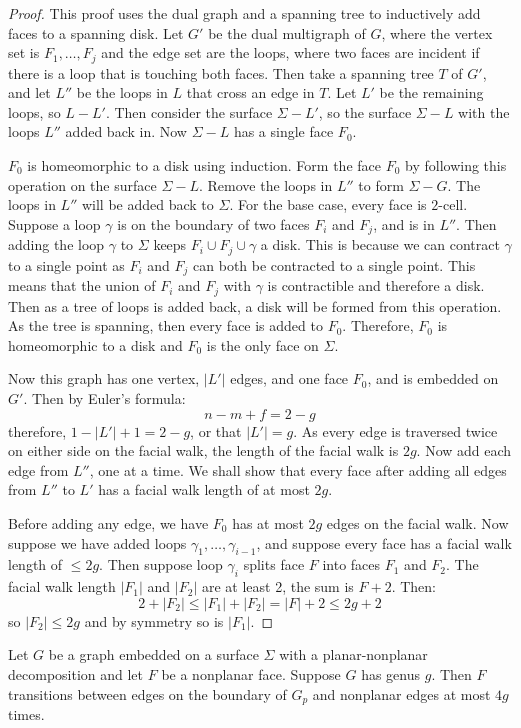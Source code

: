 \begin{proof}
	This proof uses the dual graph and a spanning tree to inductively add faces to a spanning disk. 
	Let \(G'\) be the dual multigraph of $G$, where the vertex set is \(F_1, \ldots, F_j\) and the edge set are the loops, where two faces are incident if there is a loop that is touching both faces. Then take a spanning tree \(T\) of \(G'\), and let \(L''\) be the loops in $L$ that cross an edge in \(T\). Let $L'$ be the remaining loops, so $L - L'$. 
	Then consider the surface \(\Sigma - L'\), so the surface $\Sigma - L$ with the loops $L''$ added back in. Now $\Sigma - L$ has a single face $F_0$.

	$F_0$ is homeomorphic to a disk using induction. Form the face $F_0$ by following this operation on the surface $\Sigma - L$. Remove the loops in $L''$ to form $\Sigma - G$. The loops in $L''$ will be added back to $\Sigma$. For the base case, every face is $2$-cell. Suppose a loop $\gamma$ is on the boundary of two faces $F_i$ and $F_j$, and is in $L''$. Then adding the loop $\gamma$ to $\Sigma$ keeps $F_i \cup F_j \cup \gamma$ a disk. This is because we can contract $\gamma$ to a single point as $F_i$ and $F_j$ can both be contracted to a single point. This means that the union of $F_i$ and $F_j$ with $\gamma$ is contractible and therefore a disk. Then as a tree of loops is added back, a disk will be formed from this operation. As the tree is spanning, then every face is added to $F_0$. Therefore, $F_0$ is homeomorphic to a disk and $F_0$ is the only face on $\Sigma$. 

	Now this graph has one vertex, \(|L'|\) edges, and one face \(F_0\), and is embedded on $G'$. Then by Euler's formula:
	\begin{equation}
		n - m + f = 2 - g
	\end{equation}
	therefore, \(1 - |L'| + 1 = 2 - g\), or that \(|L'| = g\). As every edge is traversed twice on either side on the facial walk, the length of the facial walk is \(2g\).
	Now add each edge from \(L''\), one at a time. We shall show that every face after adding all edges from \(L''\) to \(L'\) has a facial walk length of at most \(2g\).

	Before adding any edge, we have \(F_0\) has at most \(2g\) edges on the facial walk. Now suppose we have added loops \(\gamma_1, \ldots, \gamma_{i - 1}\), and suppose every face has a facial walk length of \(\leq 2g\).
	Then suppose loop \(\gamma_i\) splits face \(F\) into faces \(F_1\) and \(F_2\). The facial walk length \(|F_1|\) and \(|F_2|\) are at least 2, the sum is \(F + 2\). Then:
	\begin{equation}
		2 + |F_2| \leq |F_1| + |F_2| = |F| + 2 \leq 2g + 2
	\end{equation}
	so \(|F_2| \leq 2g\) and by symmetry so is \(|F_1|\).
\end{proof}
\begin{corollary}\label{corr:orientable_nonplanar_faces}
	Let \(G\) be a graph embedded on a surface \(\Sigma\) with a planar-nonplanar decomposition and let \(F\) be a nonplanar face. Suppose \(G\) has genus \(g\). Then \(F\) transitions between edges on the boundary of $G_p$ and nonplanar edges at most $4g$ times.
\end{corollary}

